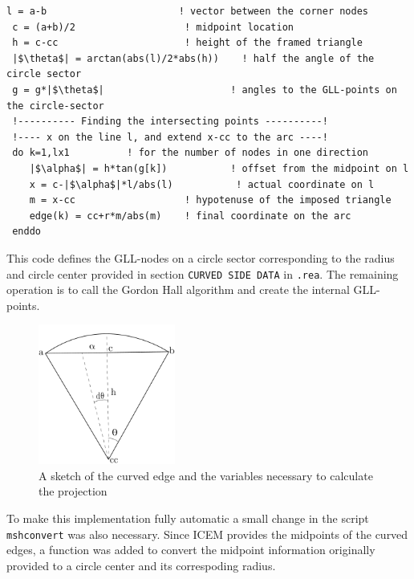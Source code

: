 \begingroup
\begin{lstlisting}[escapechar=|,frame=none]
 l = a-b                       ! vector between the corner nodes
 c = (a+b)/2                   ! midpoint location
 h = c-cc                      ! height of the framed triangle
 |$\theta$| = arctan(abs(l)/2*abs(h))    ! half the angle of the circle sector
 g = g*|$\theta$|                      ! angles to the GLL-points on the circle-sector
 !---------- Finding the intersecting points ----------!
 !---- x on the line l, and extend x-cc to the arc ----!
 do k=1,lx1          ! for the number of nodes in one direction
    |$\alpha$| = h*tan(g[k])           ! offset from the midpoint on l
    x = c-|$\alpha$|*l/abs(l)           ! actual coordinate on l
    m = x-cc                   ! hypotenuse of the imposed triangle
    edge(k) = cc+r*m/abs(m)    ! final coordinate on the arc
 enddo
\end{lstlisting}
\endgroup
This code defines the GLL-nodes on a circle sector corresponding to the radius and circle center
provided in section \verb|CURVED SIDE DATA| in \verb|.rea|.
The remaining operation is to call the Gordon Hall algorithm and create the internal GLL-points.
%
\begin{figure}[h]
    \centering
    \includegraphics[width = 0.4\textwidth]{Figures/curvature.pdf}
    \caption{A sketch of the curved edge and the variables necessary to calculate the projection}
    \label{fig:curvature}
\end{figure}
%
To make this implementation fully automatic a small change in the script \verb|mshconvert| was also necessary. 
Since ICEM provides the midpoints of the curved edges, a function was added to convert the midpoint information 
originally provided to a circle center and its correspoding radius.
